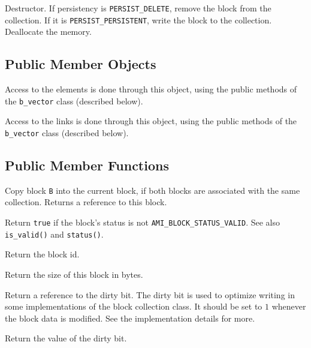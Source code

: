          {Destructor. If persistency 
        is \lstinline|PERSIST_DELETE|, remove the block from the collection. 
        If it is \lstinline|PERSIST_PERSISTENT|, write the block to the 
        collection. Deallocate the memory.}

   \etabb

\subsection{Public Member Objects}

   \btabb

         {Access to the elements is done through
        this object, using the public methods of the \lstinline|b_vector| class
        (described below).}

         {Access to the links is done
        through this object, using the public methods of the \lstinline|b_vector| class (described below).}

   \etabb

\subsection{Public Member Functions}

   \btabb
        
         {Copy
        block \lstinline|B| into the current block, if both blocks are associated
        with the same collection. Returns a reference to this block.}

         {Return \lstinline|true| if the block's status 
        is not \lstinline|AMI_BLOCK_STATUS_VALID|. See also \lstinline|is_valid()| and 
        \lstinline|status()|.}

         {Return the block id.}

         {Return the size of this block
        in bytes.}

         {Return a reference to the dirty bit. The
        dirty bit is used to optimize writing in some implementations of
        the block collection class. It should be set to $1$ whenever the
        block data is modified. See the implementation details for more.}

         {Return the value of the dirty bit.}

